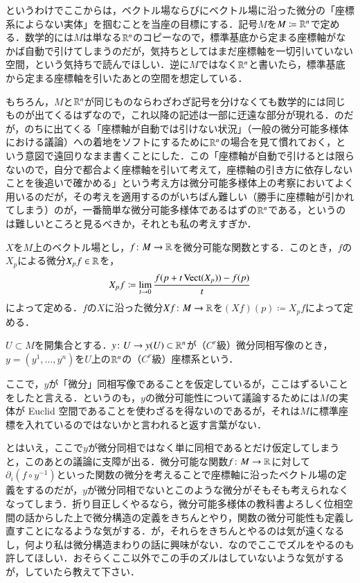 というわけでここからは，ベクトル場ならびにベクトル場に沿った微分の「座標系によらない実体」を掴むことを当座の目標にする．記号$M$を$M \coloneqq \mathbb{R}^n$で定める．数学的には$M$は単なる$\mathbb{R}^n$のコピーなので，標準基底から定まる座標軸がなかば自動で引けてしまうのだが，気持ちとしてはまだ座標軸を一切引いていない空間，という気持ちで読んでほしい．逆に$M$ではなく$\mathbb{R}^n$と書いたら，標準基底から定まる座標軸を引いたあとの空間を想定している．

\begin{dig}
もちろん，$M$と$\mathbb{R}^n$が同じものならわざわざ記号を分けなくても数学的には同じものが出てくるはずなので，これ以降の記述は一部に迂遠な部分が現れる．のだが，のちに出てくる「座標軸が自動では引けない状況」（一般の微分可能多様体における議論）への着地をソフトにするために$\mathbb{R}^n$の場合を見て慣れておく，という意図で遠回りなまま書くことにした．この「座標軸が自動で引けるとは限らないので，自分で都合よく座標軸を引いて考えて，座標軸の引き方に依存しないことを後追いで確かめる」という考え方は微分可能多様体上の考察においてよく用いるのだが，その考えを適用するのがいちばん難しい（勝手に座標軸が引かれてしまう）のが，一番簡単な微分可能多様体であるはずの$\mathbb{R}^n$である，というのは難しいところと見るべきか，それとも私の考えすぎか．
\end{dig}

\begin{defi}
$X$を$M$上のベクトル場とし，$f \colon M \to \mathbb{R}$を微分可能な関数とする．このとき，$f$の$X_p$による微分$X_pf \in \mathbb{R}$を，
\begin{equation}
X_pf \coloneqq \lim_{t \to 0} \frac{f(p + t \operatorname{Vect}(X_p)) - f(p)}{t}
\end{equation}
によって定める．$f$の$X$に沿った微分$Xf \colon M \to \mathbb{R}$を$(Xf)(p) \coloneqq X_pf$によって定める．
\end{defi}

\begin{defi}
$U \subset M$を開集合とする．$y \colon U \to y(U) \subset \mathbb{R}^n$が（$C^r$級）微分同相写像のとき，$y = (y^1, \dots, y^n)$を$U$上の$\mathbb{R}^n$の（$C^r$級）座標系という．
\end{defi}

\begin{dig}
ここで，$y$が「微分」同相写像であることを仮定しているが，ここはずるいことをしたと言える．というのも，$y$の微分可能性について議論するためには$M$の実体が Euclid 空間であることを使わざるを得ないのであるが，それは$M$に標準座標を入れているのではないかと言われると返す言葉がない．

とはいえ，ここで$y$が微分同相ではなく単に同相であるとだけ仮定してしまうと，このあとの議論に支障が出る．微分可能な関数$f \colon M \to \mathbb{R}$に対して$\partial_i (f \circ y^{-1})$といった関数の微分を考えることで座標軸に沿ったベクトル場の定義をするのだが，$y$が微分同相でないとこのような微分がそもそも考えられなくなってしまう．折り目正しくやるなら，微分可能多様体の教科書よろしく位相空間の話からした上で微分構造の定義をきちんとやり，関数の微分可能性も定義し直すことになるような気がする．が，それらをきちんとやるのは気が遠くなるし，何より私は微分構造まわりの話に興味がない．なのでここでズルをやるのも許してほしい．おそらくここ以外でこの手のズルはしていないような気がするが，していたら教えて下さい．
\end{dig}

